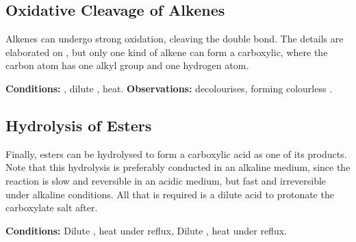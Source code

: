 

		\subsection{Oxidative Cleavage of Alkenes}

			Alkenes can undergo strong oxidation, cleaving the double bond. The details are elaborated on
			\hyperlink{OxidativeCleavageOfAlkenes}{}, but only one kind of alkene can form a carboxylic, where the carbon
			atom has one alkyl group and one hydrogen atom.

			\vspace{1.5em}
			\vbox{\textbf{Conditions:}	\tabto{35mm}, dilute , heat.}
			\vbox{\textbf{Observations:}  decolourises, forming colourless .}





		\pagebreak
		\subsection{Hydrolysis of Esters}

			Finally, esters can be hydrolysed to form a carboxylic acid as one of its products. Note that this hydrolysis is preferably
			conducted in an alkaline medium, since the reaction is slow and reversible in an acidic medium, but fast and irreversible under
			alkaline conditions. All that is required is a dilute acid to protonate the carboxylate salt after.

			\vspace{1.5em}
			\vbox{\textbf{Conditions:}	\tabto{35mm}Dilute , heat under reflux, 
										\tabto{35mm}Dilute , heat under reflux.}

